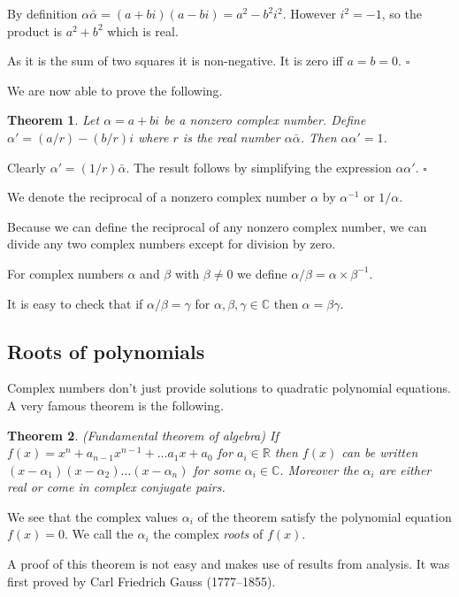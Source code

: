 \documentclass[10pt]{article}
\newcommand{\C}{\mathbb{C}}
\newcommand{\R}{\mathbb{R}}
\newcommand{\qed}{\square}
\newtheorem{theorem}{Theorem}[section]
\newenvironment{proof}[1][Proof]{\begin{trivlist}
\item[\hskip \labelsep {\bfseries #1}]}{\end{trivlist}}
\newenvironment{definition}[1][Definition]{\begin{trivlist}
\item[\hskip \labelsep {\bfseries #1}]}{\end{trivlist}}
\begin{document}
\begin{proof}
By definition $\alpha\bar{\alpha} = (a + bi)(a - bi) = a^2 - b^2i^2$. However $i^2 = -1$, so the product is $a^2 + b^2$ which is real.

As it is the sum of two squares it is non-negative. It is zero iff $a = b = 0$. $\qed$
\end{proof}

We are now able to prove the following.

\begin{theorem}
Let $\alpha = a + bi$ be a nonzero complex number. Define $\alpha' = (a/r) - (b/r)i$ where $r$ is the real number $\alpha\bar{\alpha}$. Then $\alpha\alpha' = 1$.
\end{theorem}

\begin{proof}
Clearly $\alpha' = (1/r)\bar{\alpha}$. The result follows by simplifying the expression $\alpha\alpha'$. $\qed$
\end{proof}

\begin{definition}
We denote the reciprocal of a nonzero complex number $\alpha$ by $\alpha^{-1}$ or $1/\alpha$.
\end{definition}

Because we can define the reciprocal of any nonzero complex number, we can divide any two complex numbers except for division by zero.

\begin{definition}
For complex numbers $\alpha$ and $\beta$ with $\beta \neq 0$ we define $\alpha/\beta = \alpha\times \beta^{-1}$.
\end{definition}

It is easy to check that if $\alpha/\beta = \gamma$ for $\alpha, \beta, \gamma \in \C$ then $\alpha = \beta\gamma$.

\subsection{Roots of polynomials}

Complex numbers don't just provide solutions to quadratic polynomial equations. A very famous theorem is the following.

\begin{theorem} (Fundamental theorem of algebra)
If $f(x) = x^n + a_{n-1}x^{n-1} + \ldots a_1x + a_0$ for $a_i \in \R$ then $f(x)$ can be written $(x - \alpha_1)(x - \alpha_2)\ldots(x - \alpha_n)$ for some $\alpha_i \in \C$. Moreover the $\alpha_i$ are either real or come in complex conjugate pairs.
\end{theorem}

We see that the complex values $\alpha_i$ of the theorem satisfy the polynomial equation $f(x) = 0$. We call the $\alpha_i$ the complex \emph{roots} of $f(x)$.

A proof of this theorem is not easy and makes use of results from analysis. It was first proved by Carl Friedrich Gauss (1777--1855).
\end{document}
